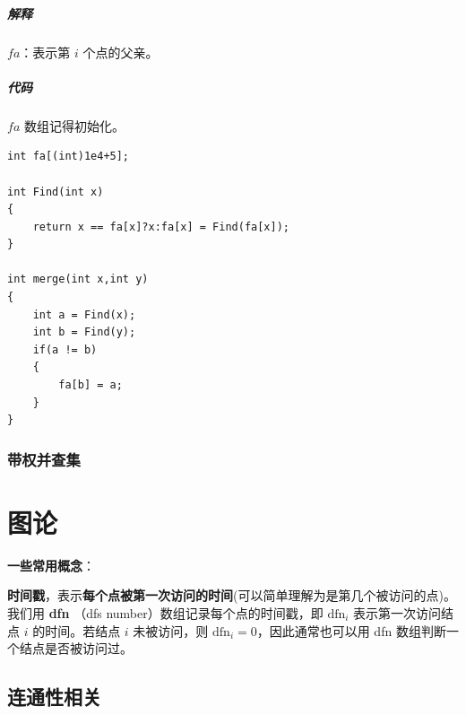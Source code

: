 \documentclass[11pt,oneside,a4paper,UTF8]{book}
\begin{document}
	\subsubsection{解释}
	$fa$：表示第 $i$ 个点的父亲。
	\subsubsection{代码}
	$fa$ 数组记得初始化。
	\begin{lstlisting}
int fa[(int)1e4+5];

int Find(int x)
{
	return x == fa[x]?x:fa[x] = Find(fa[x]);
}

int merge(int x,int y)
{
	int a = Find(x);
	int b = Find(y);
	if(a != b)
	{
		fa[b] = a;
	}
}
	\end{lstlisting}
	\section{带权并查集}
	
	
	\part{图论}
	\noindent
	\textbf{一些常用概念}：\par
	\textbf{时间戳}，表示\textbf{每个点被第一次访问的时间}(可以简单理解为是第几个被访问的点)。我们用 \textbf{dfn} （dfs number）数组记录每个点的时间戳，即 $\text{dfn}_i$ 表示第一次访问结点 $i$ 的时间。若结点 $i$ 未被访问，则 $\text{dfn}_i = 0$，因此通常也可以用 dfn 数组判断一个结点是否被访问过。
	\chapter{连通性相关}
\end{document}
